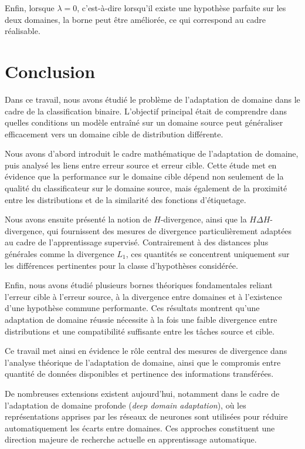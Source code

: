 \documentclass[a4paper,12pt]{article}
\theoremstyle{definition}
\theoremstyle{remark}
\begin{document}
Enfin, lorsque $\lambda = 0$, c’est-à-dire lorsqu’il existe une hypothèse parfaite sur les deux
domaines, la borne peut être améliorée, ce qui correspond au cadre réalisable.

\newpage

\section{Conclusion}

Dans ce travail, nous avons étudié le problème de l’adaptation de domaine dans le cadre
de la classification binaire. L’objectif principal était de comprendre dans quelles conditions
un modèle entraîné sur un domaine source peut généraliser efficacement vers un domaine
cible de distribution différente.

Nous avons d’abord introduit le cadre mathématique de l’adaptation de domaine, puis
analysé les liens entre erreur source et erreur cible. Cette étude met en évidence que la
performance sur le domaine cible dépend non seulement de la qualité du classificateur sur
le domaine source, mais également de la proximité entre les distributions et de la similarité
des fonctions d’étiquetage.

Nous avons ensuite présenté la notion de $H$-divergence, ainsi que la $H\Delta H$-
divergence, qui fournissent des mesures de divergence particulièrement adaptées au cadre
de l’apprentissage supervisé. Contrairement à des distances plus générales comme la
divergence $L_1$, ces quantités se concentrent uniquement sur les différences pertinentes
pour la classe d’hypothèses considérée.

Enfin, nous avons étudié plusieurs bornes théoriques fondamentales reliant l’erreur
cible à l’erreur source, à la divergence entre domaines et à l’existence d’une hypothèse
commune performante. Ces résultats montrent qu’une adaptation de domaine réussie
nécessite à la fois une faible divergence entre distributions et une compatibilité suffisante
entre les tâches source et cible.

Ce travail met ainsi en évidence le rôle central des mesures de divergence dans l’analyse
théorique de l’adaptation de domaine, ainsi que le compromis entre quantité de données
disponibles et pertinence des informations transférées.

De nombreuses extensions existent aujourd’hui, notamment dans le cadre de l’adaptation
de domaine profonde (\emph{deep domain adaptation}), où les représentations apprises par
les réseaux de neurones sont utilisées pour réduire automatiquement les écarts entre
domaines. Ces approches constituent une direction majeure de recherche actuelle en
apprentissage automatique.
\end{document}
